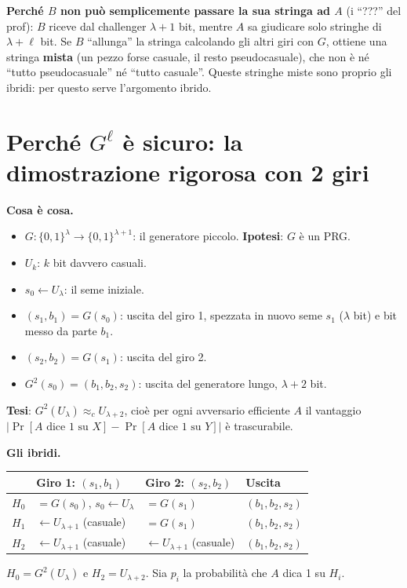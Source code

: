 \textbf{Perché \(B\) non può semplicemente passare la sua stringa ad \(A\)} (i ``???'' del prof): \(B\) riceve dal challenger \(\lambda+1\) bit, mentre \(A\) sa giudicare solo stringhe di \(\lambda+\ell\) bit. Se \(B\) ``allunga'' la stringa calcolando gli altri giri con \(G\), ottiene una stringa \textbf{mista} (un pezzo forse casuale, il resto pseudocasuale), che non è né ``tutto pseudocasuale'' né ``tutto casuale''. Queste stringhe miste sono proprio gli ibridi: per questo serve l'argomento ibrido.

\section{Perché \texorpdfstring{\(G^\ell\)}{G\^{}l} è sicuro: la dimostrazione rigorosa con 2 giri}

\textbf{Cosa è cosa.}
\begin{itemize}
  \item \(G : \{0,1\}^\lambda \to \{0,1\}^{\lambda+1}\): il generatore piccolo. \textbf{Ipotesi}: \(G\) è un PRG.
  \item \(U_k\): \(k\) bit davvero casuali.
  \item \(s_0 \leftarrow U_\lambda\): il seme iniziale.
  \item \((s_1, b_1) = G(s_0)\): uscita del giro 1, spezzata in nuovo seme \(s_1\) (\(\lambda\) bit) e bit messo da parte \(b_1\).
  \item \((s_2, b_2) = G(s_1)\): uscita del giro 2.
  \item \(G^2(s_0) = (b_1, b_2, s_2)\): uscita del generatore lungo, \(\lambda+2\) bit.
\end{itemize}

\textbf{Tesi}: \(G^2(U_\lambda) \approx_c U_{\lambda+2}\), cioè per ogni avversario efficiente \(A\) il vantaggio \(|\Pr[A \text{ dice } 1 \text{ su } X] - \Pr[A \text{ dice } 1 \text{ su } Y]|\) è trascurabile.

\textbf{Gli ibridi.}
\begin{center}
\begin{tabular}{llll}
\toprule
 & Giro 1: \((s_1, b_1)\) & Giro 2: \((s_2, b_2)\) & Uscita \\
\midrule
\(H_0\) & \(= G(s_0)\), \(s_0 \leftarrow U_\lambda\) & \(= G(s_1)\) & \((b_1, b_2, s_2)\) \\
\(H_1\) & \(\leftarrow U_{\lambda+1}\) (casuale) & \(= G(s_1)\) & \((b_1, b_2, s_2)\) \\
\(H_2\) & \(\leftarrow U_{\lambda+1}\) (casuale) & \(\leftarrow U_{\lambda+1}\) (casuale) & \((b_1, b_2, s_2)\) \\
\bottomrule
\end{tabular}
\end{center}
\(H_0 = G^2(U_\lambda)\) e \(H_2 = U_{\lambda+2}\). Sia \(p_i\) la probabilità che \(A\) dica 1 su \(H_i\).

